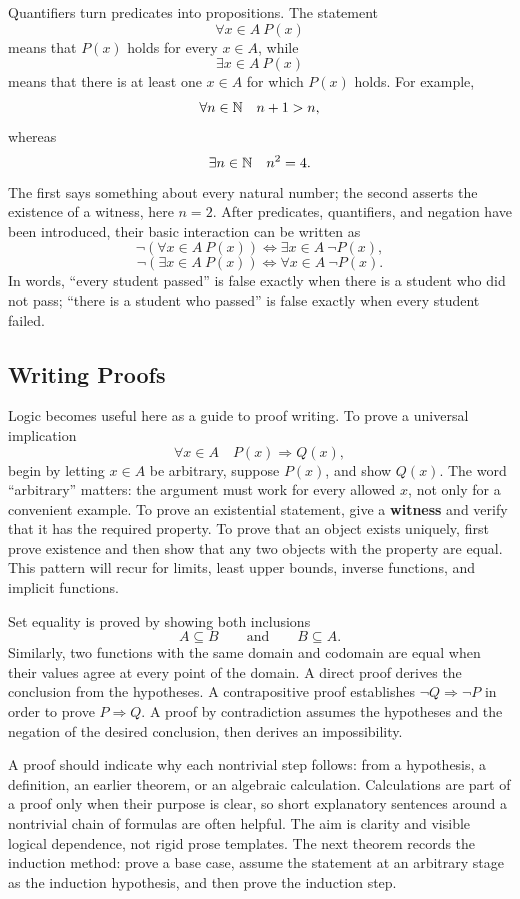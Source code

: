 Quantifiers turn predicates into propositions. The statement
\[
\forall x\in A\ P(x)
\]
means that \(P(x)\) holds for every \(x\in A\), while
\[
\exists x\in A\ P(x)
\]
means that there is at least one \(x\in A\) for which \(P(x)\) holds. For
example,
\[
\forall n\in\mathbb{N}\quad n+1>n,
\]
whereas
\[
\exists n\in\mathbb{N}\quad n^2=4.
\]
The first says something about every natural number; the second asserts the
existence of a witness, here \(n=2\). After predicates, quantifiers, and
negation have been introduced, their basic interaction can be written as
\[
\neg(\forall x\in A\ P(x))\Longleftrightarrow\exists x\in A\ \neg P(x),
\]
\[
\neg(\exists x\in A\ P(x))\Longleftrightarrow\forall x\in A\ \neg P(x).
\]
In words, ``every student passed'' is false exactly when there is a student
who did not pass; ``there is a student who passed'' is false exactly when
every student failed.

\subsection{Writing Proofs}

Logic becomes useful here as a guide to proof writing. To prove a universal
implication
\[
\forall x\in A\quad P(x)\Rightarrow Q(x),
\]
begin by letting \(x\in A\) be arbitrary, suppose \(P(x)\), and show
\(Q(x)\). The word ``arbitrary'' matters: the argument must work for every
allowed \(x\), not only for a convenient example. To prove an existential
statement, give a \textbf{witness} and verify that it has the required
property. To prove that an object exists uniquely, first prove existence and
then show that any two objects with the property are equal. This pattern will
recur for limits, least upper bounds, inverse functions, and implicit
functions.

Set equality is proved by showing both inclusions
\[
A\subseteq B
\qquad\text{and}\qquad
B\subseteq A.
\]
Similarly, two functions with the same domain and codomain are equal when
their values agree at every point of the domain. A direct proof derives the
conclusion from the hypotheses. A contrapositive proof establishes
\(\neg Q\Rightarrow\neg P\) in order to prove \(P\Rightarrow Q\). A proof
by contradiction assumes the hypotheses and the negation of the desired
conclusion, then derives an impossibility.

A proof should indicate why each nontrivial step follows: from a hypothesis,
a definition, an earlier theorem, or an algebraic calculation. Calculations
are part of a proof only when their purpose is clear, so short explanatory
sentences around a nontrivial chain of formulas are often helpful. The aim is
clarity and visible logical dependence, not rigid prose templates. The next
theorem records the induction method: prove a base case, assume the statement
at an arbitrary stage as the induction hypothesis, and then prove the
induction step.


